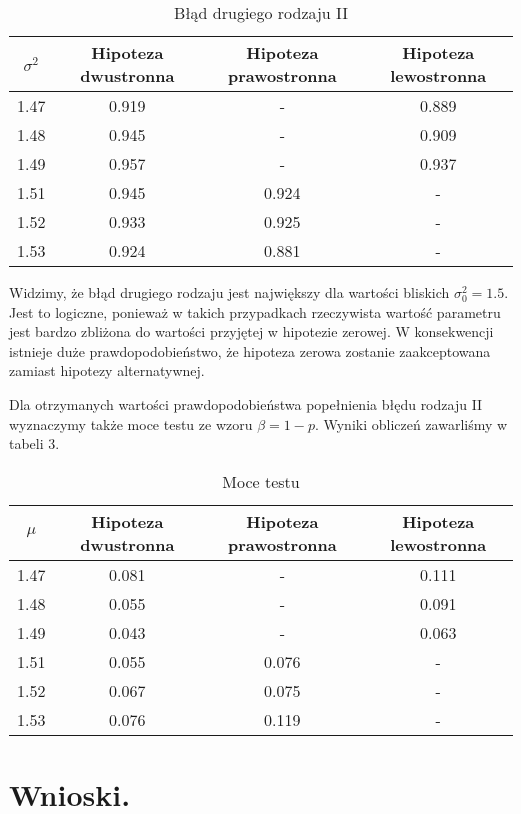 \documentclass[12pt,letterpaper]{article}
\theoremstyle{definition}
\begin{document}
{{\begin{table}[h!]
    \centering
    \caption{Błąd drugiego rodzaju II}
    \begin{tabular}{cccc}
        \toprule
        $\sigma^2$ & Hipoteza dwustronna & Hipoteza prawostronna & Hipoteza lewostronna \\
        \midrule
        1.47 & 0.919 & - & 0.889 \\
        1.48 & 0.945 & - & 0.909 \\
        1.49 & 0.957 & - & 0.937 \\
        1.51 & 0.945 & 0.924 & - \\
        1.52 & 0.933 & 0.925 & - \\
        1.53 & 0.924 & 0.881 & - \\
        \bottomrule
    \end{tabular}
\end{table}

Widzimy, że błąd drugiego rodzaju jest największy dla wartości bliskich $\sigma^2_0 = 1.5$. Jest to logiczne, ponieważ w takich przypadkach rzeczywista wartość parametru jest bardzo zbliżona do wartości przyjętej w hipotezie zerowej. W konsekwencji istnieje duże prawdopodobieństwo, że hipoteza zerowa zostanie zaakceptowana zamiast hipotezy alternatywnej.


Dla otrzymanych wartości prawdopodobieństwa popełnienia błędu rodzaju
II wyznaczymy także moce testu ze wzoru $\beta = 1 - p$. Wyniki obliczeń
zawarliśmy w tabeli 3.


\begin{table}[h!]
    \centering
    \caption{Moce testu}
    \begin{tabular}{cccc}
        \toprule
        $\mu$ & Hipoteza dwustronna & Hipoteza prawostronna & Hipoteza lewostronna \\
        \midrule
        1.47 & 0.081 & - & 0.111 \\
        1.48 & 0.055 & - & 0.091 \\
        1.49 & 0.043 & - & 0.063 \\
        1.51 & 0.055 & 0.076 & - \\
        1.52 & 0.067 & 0.075 & - \\
        1.53 & 0.076 & 0.119 & - \\
        \bottomrule
    \end{tabular}
\end{table}

\section{Wnioski.}

}}
\end{document}
